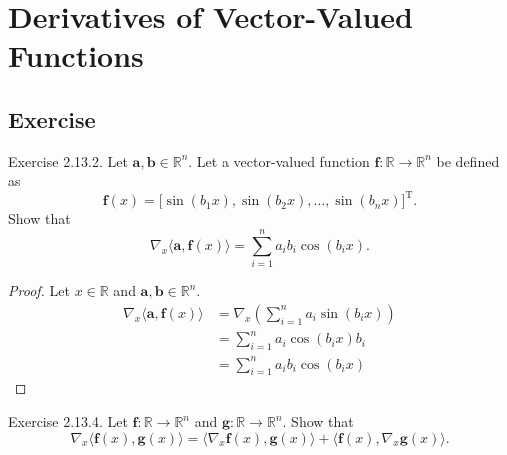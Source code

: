 \documentclass{article}
\theoremstyle{plain}
\begin{document}
\section{Derivatives of Vector-Valued Functions}

\subsection{Exercise}

\begin{itembox}[l]{Exercise 2.13.2.}
	Let
	\begin{math}
		\bm{a} , \bm{b} \in \mathbb{R}^n .
	\end{math}
	Let a vector-valued function $\bm{f}: \mathbb{R} \rightarrow \mathbb{R}^n$ be defined as
	\begin{equation*}
		\bm{f}(x) = \lbrack \sin(b_1 x) , \sin(b_2 x) , \ldots , \sin(b_n x) \rbrack^\mathrm{T} .
	\end{equation*}
	Show that
	\begin{equation*}
		\nabla_x \langle \bm{a} , \bm{f}(x) \rangle = \sum_{i=1}^n a_i b_i \cos(b_i x) .
	\end{equation*}
\end{itembox}


\begin{proof}
	Let
	\begin{math}
		x \in \mathbb{R}
	\end{math}
	and
	\begin{math}
		\bm{a} , \bm{b} \in \mathbb{R}^n .
	\end{math}
	\begin{equation*}
		\begin{split}
			\nabla_x \langle \bm{a} , \bm{f}(x) \rangle
			&= \nabla_x \left( \sum_{i=1}^n a_i \sin(b_i x) \right) \\
			&= \sum_{i=1}^n a_i \cos(b_i x) b_i \\
			&= \sum_{i=1}^n a_i b_i \cos(b_i x)
		\end{split}
	\end{equation*}
\end{proof}


\begin{itembox}[l]{Exercise 2.13.4.}
	Let
	\begin{math}
		\bm{f}: \mathbb{R} \rightarrow \mathbb{R}^n
	\end{math}
	and
	\begin{math}
		\bm{g}: \mathbb{R} \rightarrow \mathbb{R}^n .
	\end{math}
	Show that
	\begin{equation}
		\label{ex2134}
		\nabla_x \langle \bm{f}(x) , \bm{g}(x) \rangle
		= \langle \nabla_x \bm{f}(x) , \bm{g}(x) \rangle
		+ \langle \bm{f}(x) , \nabla_x \bm{g}(x) \rangle .
	\end{equation}
\end{itembox}
\end{document}
